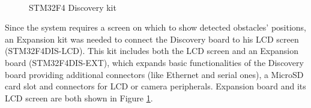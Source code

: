 \begin{figure}
\centering
\hspace*{\fill}
\hfill
{}
\hspace*{\fill}
\\

\caption{STM32F4 Discovery kit}
\label{fig:board}
\end{figure}

Since the system requires a screen on which to show detected obstacles' positions, an Expansion kit was needed to connect the Discovery board to his LCD screen (STM32F4DIS-LCD). This kit includes both the LCD screen and an Expansion board (STM32F4DIS-EXT), which expands basic functionalities of the Discovery board providing additional connectors (like Ethernet and serial ones), a MicroSD card slot and connectors for LCD or camera peripherals. Expansion board and its LCD screen are both shown in Figure \ref{fig:board}.


